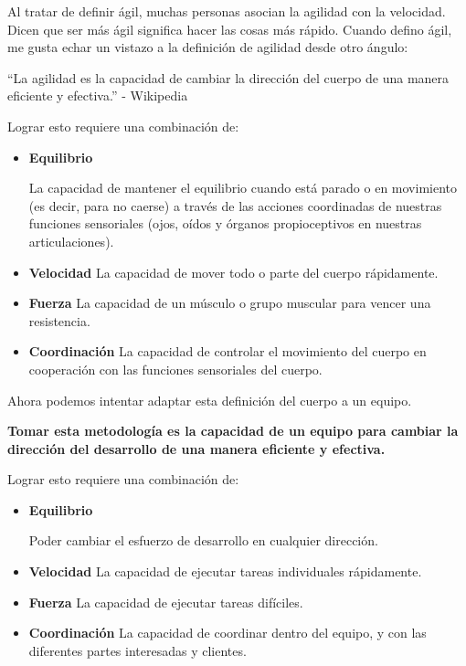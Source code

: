 \documentclass[12pt, fleqn]{report}                             %
\theoremstyle{break}                                            %
\begin{document}
    
    	Al tratar de definir ágil, muchas personas asocian la agilidad con la velocidad. Dicen que ser más
    	ágil significa hacer las cosas más rápido. Cuando defino ágil, me gusta echar un vistazo a la
    	definición de agilidad desde otro ángulo:
    
    	``La agilidad es la capacidad de cambiar la dirección del cuerpo de una manera eficiente y efectiva.'' - Wikipedia
    	
    	
    	\clearpage
    
    	Lograr esto requiere una combinación de:
    
    	\begin{itemize}
    		\item \textbf{Equilibrio}
    
    			La capacidad de mantener el equilibrio cuando está parado o en movimiento
    			(es decir, para no caerse) a través de las acciones coordinadas de nuestras
    			funciones sensoriales (ojos, oídos y órganos propioceptivos en nuestras articulaciones).
    
    		\item \textbf{Velocidad}
    			La capacidad de mover todo o parte del cuerpo rápidamente.
    
    		\item \textbf{Fuerza}
    			La capacidad de un músculo o grupo muscular para vencer una resistencia.
    
    		\item \textbf{Coordinación}
    			La capacidad de controlar el movimiento del cuerpo en cooperación con las funciones
    			sensoriales del cuerpo.
    	\end{itemize}
    
    	Ahora podemos intentar adaptar esta definición del cuerpo a un equipo.
    
    	\textbf{Tomar esta metodología es la capacidad de un equipo para cambiar la dirección del
    	desarrollo de una manera eficiente y efectiva.}
    
    
    	Lograr esto requiere una combinación de:
    
    	\begin{itemize}
    		\item \textbf{Equilibrio}
    
    			Poder cambiar el esfuerzo de desarrollo en cualquier dirección.
    
    		\item \textbf{Velocidad}
    			La capacidad de ejecutar tareas individuales rápidamente.
    
    		\item \textbf{Fuerza}
    			La capacidad de ejecutar tareas difíciles.
    
    		\item \textbf{Coordinación}
    			La capacidad de coordinar dentro del equipo, y con las diferentes partes interesadas y clientes.
    	\end{itemize}
    
\end{document}
